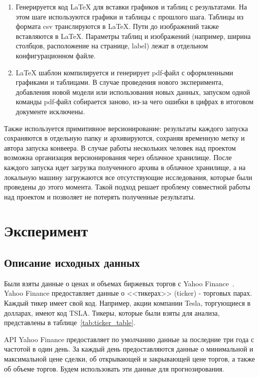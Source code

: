 \documentclass[a4paper,article,14pt]{extarticle}
\begin{document}
\begin{enumerate}
    \item Генерируется код LaTeX для вставки графиков и таблиц с результатами.
На этом шаге используются графики и таблицы с прошлого шага.
Таблицы из формата csv транслируются в LaTeX\@.
Пути до изображений также вставляются в LaTeX\@.
Параметры таблиц и изображений (например, ширина столбцов, расположение на странице, label) лежат в отдельном конфигурационном файле.
    \item LaTeX шаблон компилируется и генерирует pdf-файл с оформленными графиками и таблицами.
В случае проведения нового эксперимента, добавления новой модели или использования новых данных, запуском одной команды pdf-файл собирается заново, из-за чего ошибки в цифрах в итоговом документе исключены.
\end{enumerate}
\par

Также используется примитивное версионирование: результаты каждого запуска сохраняются в отдельную папку и архивируются, сохраняя временную метку и автора запуска конвеера.
В случае работы нескольких человек над проектом возможна организация версионирования через облачное хранилище.
После каждого запуска идет загрузка полученного архива в облачное хранилище, а на локальную машину загружаются все отсутствующие исследования, которые были проведены до этого момента.
Такой подход решает проблему совместной работы над проектом и позволяет не потерять полученные результаты.

\pagebreak
\section{Эксперимент}

\subsection{Описание исходных данных}
Были взяты данные о ценах и объемах биржевых торгов с Yahoo Finance~\cite{yahoo}.
Yahoo Finance предоставляет данные о <<тикерах>> (ticker) - торговых парах.
Каждый тикер имеет свой код. 
Например, акции компании Tesla, торгующиеся в долларах, имеют код TSLA\@.
Тикеры, которые были взяты для анализа, представлены в таблице~\ref{tab:ticker_table}.


API Yahoo Finance предоставляет по умолчанию данные за последние три года с частотой в один день. 
За каждый день предоставляются данные о минимальной и максимальной цене сделки, об открывающей и закрывающей цене торгов, а также об объеме торгов.
Будем использовать эти данные для прогнозирования.
\end{document}
